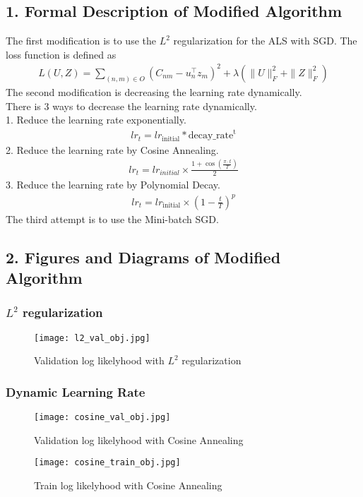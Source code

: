 \documentclass[12pt]{article}
\begin{document}
\subsection*{1. Formal Description of Modified Algorithm}
The first modification is to use the $L^2$ regularization for the ALS with SGD. The loss function is defined as
\begin{align*}
L(U,Z) = \sum_{(n,m) \in O} (C_{nm} - u_n^\top z_m)^2 + \lambda \left( \|U\|_F^2 + \|Z\|_F^2 \right)
\end{align*}
The second modification is decreasing the learning rate dynamically.\\
There is 3 ways to decrease the learning rate dynamically.\\
1. Reduce the learning rate exponentially.\\
\begin{align*}
lr_t = lr_{\text{initial}} * \text{decay\_rate}^{\text{t}}
\end{align*}
2. Reduce the learning rate by Cosine Annealing.\\
\begin{align*}
lr_t = lr_{initial} \times \frac{1 + \cos\left(\frac{\pi \cdot t}{T}\right)}{2}
\end{align*}
3. Reduce the learning rate by Polynomial Decay.\\
\begin{align*}
lr_t = lr_{\text{initial}} \times (1 - \frac{t}{T})^p
\end{align*}
The third attempt is to use the Mini-batch SGD.\\


\subsection*{2. Figures and Diagrams of Modified Algorithm}
\subsubsection*{$L^2$ regularization}
\begin{figure}[h]
\centering
\texttt{[image: l2\_val\_obj.jpg]}
\caption{Validation log likelyhood with $L^2$ regularization}
\label{fig:vlld}
\end{figure}
\subsubsection*{Dynamic Learning Rate}
\begin{figure}[h]
    \begin{minipage}{0.4\textwidth}
    \centering
    \texttt{[image: cosine\_val\_obj.jpg]}
    \caption{Validation log likelyhood with Cosine Annealing}
    \label{fig:vlld}
    \end{minipage}%
    \begin{minipage}{0.4\textwidth}
    \centering
    \texttt{[image: cosine\_train\_obj.jpg]}
    \caption{Train log likelyhood with Cosine Annealing}
    \label{fig:tlld}
    \end{minipage}%
\end{figure}
\end{document}
